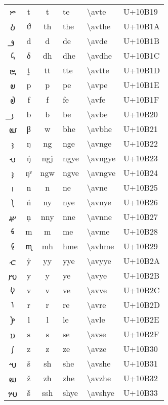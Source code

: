 {\begin{longtable}{ccclll}
{\avfont 𐬙 } &t &t &te &\textbackslash avte &U+10B19 \\
{\avfont 𐬚 } &ϑ &th &the &\textbackslash avthe &U+10B1A \\
{\avfont 𐬛 } &d &d &de &\textbackslash avde &U+10B1B \\
{\avfont 𐬜 } &δ &dh &dhe &\textbackslash avdhe &U+10B1C \\
{\avfont 𐬝 } &t̰ &tt &tte &\textbackslash avtte &U+10B1D \\
{\avfont 𐬞 } &p &p &pe &\textbackslash avpe &U+10B1E \\
{\avfont 𐬟 } &f &f &fe &\textbackslash avfe &U+10B1F \\
{\avfont 𐬠 } &b &b &be &\textbackslash avbe &U+10B20 \\
{\avfont 𐬡 } &β &w &bhe &\textbackslash avbhe &U+10B21 \\
{\avfont 𐬢 } &ŋ &ng &nge &\textbackslash avnge &U+10B22 \\
{\avfont 𐬣 } &ŋ́ &ngj &ngye &\textbackslash avngye &U+10B23 \\
{\avfont 𐬤 } &ŋᵛ &ngw &ngve &\textbackslash avngve &U+10B24 \\
{\avfont 𐬥 } &n &n &ne &\textbackslash avne &U+10B25 \\
{\avfont 𐬦 } &ń &ny &nye &\textbackslash avnye &U+10B26 \\
{\avfont 𐬧 } &ṇ &nny &nne &\textbackslash avnne &U+10B27 \\
{\avfont 𐬨 } &m &m &me &\textbackslash avme &U+10B28 \\
{\avfont 𐬩 } &m̨ &mh &hme &\textbackslash avhme &U+10B29 \\
{\avfont 𐬪 } &ẏ &yy &yye &\textbackslash avyye &U+10B2A \\
{\avfont 𐬫 } &y &y &ye &\textbackslash avye &U+10B2B \\
{\avfont 𐬬 } &v &v &ve &\textbackslash avve &U+10B2C \\
{\avfont 𐬭 } &r &r &re &\textbackslash avre &U+10B2D \\
{\avfont 𐬮 } &l &l &le &\textbackslash avle &U+10B2E \\
{\avfont 𐬯 } &s &s &se &\textbackslash avse &U+10B2F \\
{\avfont 𐬰 } &z &z &ze &\textbackslash avze &U+10B30 \\
{\avfont 𐬱 } &š &sh &she &\textbackslash avshe &U+10B31 \\
{\avfont 𐬲 } &ž &zh &zhe &\textbackslash avzhe &U+10B32 \\
{\avfont 𐬳 } &š́ &ssh &shye &\textbackslash avshye &U+10B33 \\

\end{longtable}}
